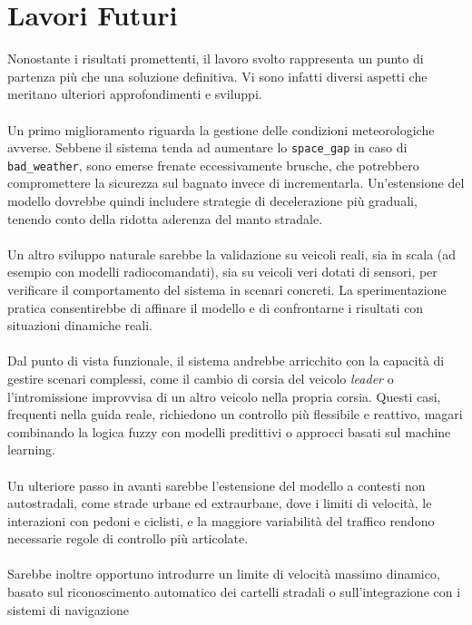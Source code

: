 \chapter{Lavori Futuri}

\noindent Nonostante i risultati promettenti, il lavoro svolto rappresenta un punto di partenza 
più che una soluzione definitiva. Vi sono infatti diversi aspetti che meritano ulteriori 
approfondimenti e sviluppi.
\\\\
\noindent Un primo miglioramento riguarda la gestione delle condizioni meteorologiche avverse.  
Sebbene il sistema tenda ad aumentare lo \texttt{space\_gap} in caso di \texttt{bad\_weather}, 
sono emerse frenate eccessivamente brusche, che potrebbero compromettere la sicurezza 
sul bagnato invece di incrementarla.  
Un'estensione del modello dovrebbe quindi includere strategie di decelerazione più graduali, 
tenendo conto della ridotta aderenza del manto stradale.
\\\\
\noindent Un altro sviluppo naturale sarebbe la validazione su veicoli reali, sia in scala (ad esempio con modelli radiocomandati), 
sia su veicoli veri dotati di sensori, per verificare il comportamento del sistema in scenari concreti.  
La sperimentazione pratica consentirebbe di affinare il modello e di confrontarne i risultati con situazioni dinamiche reali.
\\\\
\noindent Dal punto di vista funzionale, il sistema andrebbe arricchito con la capacità di gestire scenari complessi, 
come il cambio di corsia del veicolo \emph{leader} o l'intromissione improvvisa di un altro veicolo nella propria corsia.  
Questi casi, frequenti nella guida reale, richiedono un controllo più flessibile e reattivo, 
magari combinando la logica fuzzy con modelli predittivi o approcci basati sul machine learning.
\\\\
\noindent Un ulteriore passo in avanti sarebbe l'estensione del modello a contesti non autostradali, 
come strade urbane ed extraurbane, dove i limiti di velocità, le interazioni con pedoni e ciclisti, 
e la maggiore variabilità del traffico rendono necessarie regole di controllo più articolate. 
\\\\ 
\noindent Sarebbe inoltre opportuno introdurre un limite di velocità massimo dinamico, 
basato sul riconoscimento automatico dei cartelli stradali o sull'integrazione con i sistemi di navigazione 

